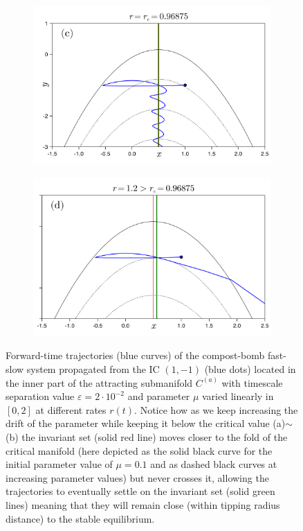 \documentclass[../main.tex]{subfiles}
\begin{document}
\begin{example_continued}
\begin{figure}[H]
    \begin{subfigure}[b]{0.485\textwidth}
        \centering 
        \includegraphics[keepaspectratio, width = \linewidth]{../figures/fig3.2.3.png}
        \label{fig3.2.3}
    \end{subfigure}
    \hfill
    \begin{subfigure}[b]{0.485\textwidth}
        \centering 
        \includegraphics[keepaspectratio, width = \linewidth]{../figures/fig3.2.4.png}
        \label{fig3.2.4}
    \end{subfigure}
    \caption{Forward-time trajectories (blue curves) of the compost-bomb fast-slow system propagated from the IC $(1,-1)$ (blue dots) located in the inner part of the attracting submanifold $C^{(a)}$ with timescale separation value $\varepsilon = 2\cdot10^{-2}$ and parameter $\mu$ varied linearly in $[0,2]$ at different rates $r(t)$.
            Notice how as we keep increasing the drift of the parameter while keeping it below the critical value (a)$\sim$(b) the invariant set (solid red line) moves closer to the fold of the critical manifold (here depicted as the solid black curve for the initial parameter value of $\mu=0.1$ and as dashed black curves at increasing parameter values) but never crosses it, allowing the trajectories to eventually settle on the invariant set (solid green lines) meaning that they will remain close (within tipping radius distance) to the stable equilibrium. 
}
\end{figure}
\end{example_continued}
\end{document}
